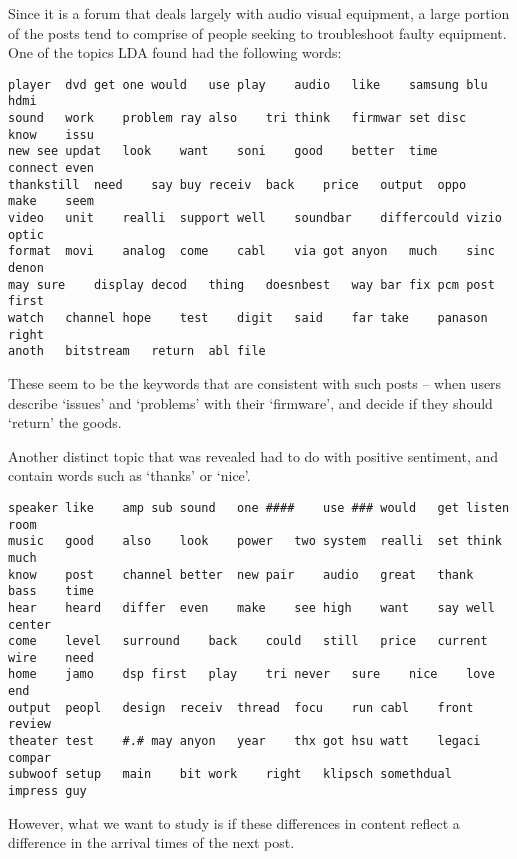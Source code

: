 Since it is a forum that deals largely with audio visual equipment, a large 
portion of the posts tend to comprise of people seeking to troubleshoot faulty 
equipment.  One of the topics LDA found had the following words:
\begin{verbatim}
player	dvd	get	one	would	use	play	audio	like	samsung	blu	hdmi	
sound	work	problem	ray	also	tri	think	firmwar	set	disc	know	issu	
new	see	updat	look	want	soni	good	better	time	connect	even	
thankstill	need	say	buy	receiv	back	price	output	oppo	make	seem	
video	unit	realli	support	well	soundbar	differcould	vizio	optic	
format	movi	analog	come	cabl	via	got	anyon	much	sinc	denon	
may	sure	display	decod	thing	doesnbest	way	bar	fix	pcm	post	first	
watch	channel	hope	test	digit	said	far	take	panason	right	
anoth	bitstream	return	abl	file
\end{verbatim}

These seem to be the keywords that are consistent with such posts -- when users 
describe `issues' and `problems' with their `firmware', and decide if they 
should `return' the goods.

Another distinct topic that was revealed had to do with positive sentiment, and 
contain words such as `thanks' or `nice'.
\begin{verbatim}
speaker	like	amp	sub	sound	one	####	use	###	would	get	listen	room	
music	good	also	look	power	two	system	realli	set	think	much	
know	post	channel	better	new	pair	audio	great	thank	bass	time	
hear	heard	differ	even	make	see	high	want	say	well	center	
come	level	surround	back	could	still	price	current	wire	need	
home	jamo	dsp	first	play	tri	never	sure	nice	love	end	
output	peopl	design	receiv	thread	focu	run	cabl	front	review	
theater	test	#.#	may	anyon	year	thx	got	hsu	watt	legaci	compar	
subwoof	setup	main	bit	work	right	klipsch	somethdual	impress	guy
\end{verbatim}


However, what we want to study is if these differences in content reflect a 
difference in the arrival times of the next post.

